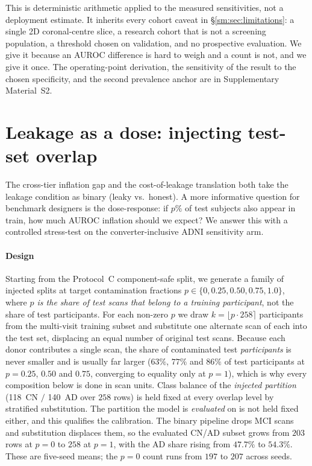 \documentclass[11pt]{article}
\begin{document}
This is deterministic arithmetic applied to the measured sensitivities, not
a deployment estimate. It inherits every cohort caveat in
\S\ref{sm:sec:limitations}: a single 2D coronal-centre slice, a research cohort
that is not a screening population, a threshold chosen on validation, and no
prospective evaluation. We give it because an AUROC difference is hard to
weigh and a count is not, and we give it once. The operating-point
derivation, the sensitivity of the result to the chosen specificity, and the
second prevalence anchor are in Supplementary Material~S2.



\section{Leakage as a dose: injecting test-set overlap}
\label{sm:sec:adni_dose_response}

The cross-tier inflation gap and the cost-of-leakage translation both
take the leakage condition as binary (leaky vs.\ honest). A more
informative question for benchmark designers is the dose-response: if
$p\%$ of test subjects also appear in train, how much AUROC inflation
should we expect? We answer this with a controlled stress-test on
the converter-inclusive ADNI sensitivity arm.

\paragraph{Design}
Starting from the Protocol~C component-safe split, we generate a family
of injected splits at target contamination fractions
$p \in \{0, 0.25, 0.50, 0.75, 1.0\}$, where \emph{$p$ is the share of
test scans that belong to a training participant}, not the share of
test participants. For each non-zero $p$ we draw
$k = \lfloor p \cdot 258 \rceil$ participants from the multi-visit
training subset and substitute one alternate scan of each into the test
set, displacing an equal number of original test scans. Because each
donor contributes a single scan, the share of contaminated test
\emph{participants} is never smaller and is usually far larger ($63\%$,
$77\%$ and $86\%$ of test participants at $p = 0.25$, $0.50$ and
$0.75$, converging to equality only at $p = 1$), which is why every
composition below is done in scan units. Class
balance of the \emph{injected partition} (118~CN $/$ 140~AD over $258$
rows) is held fixed at every overlap level by stratified substitution.
The partition the model is \emph{evaluated} on is not held fixed either,
and this qualifies the calibration. The binary pipeline drops MCI scans and
substitution displaces them, so the evaluated CN/AD subset grows from $203$
rows at $p=0$ to $258$ at $p=1$, with the AD share rising from $47.7\%$ to
$54.3\%$. These are five-seed means; the $p=0$ count runs from $197$ to
$207$ across seeds.
\end{document}
